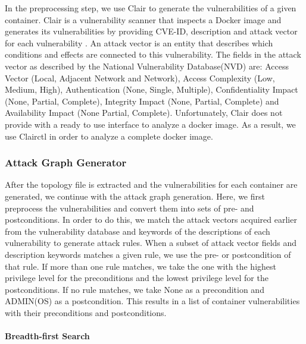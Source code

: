 In the preprocessing step, we use Clair to generate the vulnerabilities of a given container. Clair is a vulnerability scanner that inspects a Docker image and generates its vulnerabilities by providing CVE-ID, description and attack vector for each vulnerability \cite{clair}. An attack vector is an entity that describes which conditions and effects are connected to this vulnerability. The fields in the attack vector as described by the National Vulnerability Database(NVD) \cite{booth2013national} are: Access Vector (Local, Adjacent Network and Network), Access Complexity (Low, Medium, High), Authentication (None, Single, Multiple), Confidentiality Impact (None, Partial, Complete), Integrity Impact (None, Partial, Complete) and Availability Impact (None Partial, Complete). Unfortunately, Clair does not provide with a ready to use interface to analyze a docker image. As a result, we use Clairctl \cite{clairctl} in order to analyze a complete docker image.


\subsubsection{Attack Graph Generator}
\label{chap:attack_graph_p}

After the topology file is extracted and the vulnerabilities for each container are generated, we continue with the attack graph generation. Here, we first preprocess the vulnerabilities and convert them into sets of pre- and postconditions. In order to do this, we match the attack vectors acquired earlier from the vulnerability database and keywords of the descriptions of each vulnerability to generate attack rules. When a subset of attack vector fields and description keywords matches a given rule, we use the pre- or postcondition of that rule. If more than one rule matches, we take the one with the highest privilege level for the preconditions and the lowest privilege level for the postconditions. If no rule matches, we take None as a precondition and ADMIN(OS) as a postcondition. This results in a list of container vulnerabilities with their preconditions and postconditions.

\paragraph{Breadth-first Search}
\label{chap:bfs}

